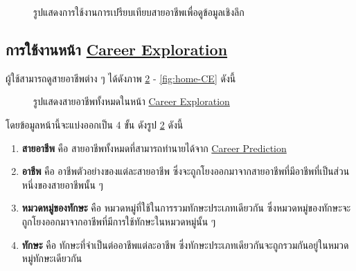 \begin{figure}[H]\centering
    \caption{รูปแสดงการใช้งานการเปรียบเทียบสายอาชีพเพื่อดูข้อมูลเชิงลึก}\label{fig:compare-CI}
\end{figure}
\subsection{การใช้งานหน้า \hyperref[subsec:Career Exploration]{Career Exploration}}
ผู้ใช้สามารถดูสายอาชีพต่าง ๆ ได้ดังภาพ \ref{fig:info-CE} - \ref{fig:home-CE} ดังนี้
\begin{figure}[H]\centering
    \caption{รูปแสดงสายอาชีพทั้งหมดในหน้า \hyperref[subsec:Career Exploration]{Career Exploration}}\label{fig:info-CE}
\end{figure}
โดยข้อมูลหน้านี้จะแบ่งออกเป็น 4 ขั้น ดังรูป \ref{fig:info-CE} ดังนี้
\begin{enumerate}
    \item \textbf{สายอาชีพ} คือ สายอาชีพทั้งหมดที่สามารถทำนายได้จาก \hyperref[subsec:Career Prediction]{Career Prediction}
    \item \textbf{อาชีพ} คือ อาชีพตัวอย่างของแต่ละสายอาชีพ ซึ่งจะถูกโยงออกมาจากสายอาชีพที่มีอาชีพที่เป็นส่วนหนึ่งของสายอาชีพนั้น ๆ
    \item \textbf{หมวดหมู่ของทักษะ} คือ หมวดหมู่ที่ใช้ในการรวมทักษะประเภทเดียวกัน ซึ่งหมวดหมู่ของทักษะจะถูกโยงออกมาจากอาชีพที่มีการใช้ทักษะในหมวดหมู่นั้น ๆ 
    \item \textbf{ทักษะ} คือ ทักษะที่จำเป็นต่ออาชีพแต่ละอาชีพ ซึ่งทักษะประเภทเดียวกันจะถูกรวมกันอยู่ในหมวดหมู่ทักษะเดียวกัน
\end{enumerate}

